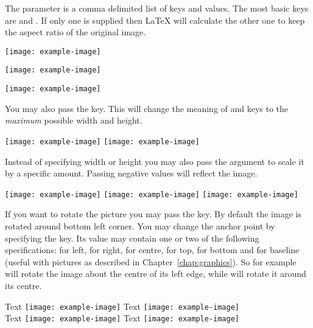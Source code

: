 The  parameter is a comma delimited list of keys and values. The
most basic keys are  and . If only one is supplied
then \LaTeX{} will calculate the other one to keep the aspect ratio of the
original image.
\begin{example}[examplewidth=2.7cm]
\texttt{[image: example-image]}

\texttt{[image: example-image]}

\texttt{[image: example-image]}
\end{example}

You may also pass the  key. This will change the meaning
of  and  keys to the \emph{maximum} possible width
and height.
\begin{example}
\texttt{[image: example-image]}
\texttt{[image: example-image]}
\end{example}

Instead of specifying width or height you may also pass the 
argument to scale it by a specific amount. Passing negative values will
reflect the image.
\begin{example}
\texttt{[image: example-image]}
\texttt{[image: example-image]}
\texttt{[image: example-image]}
\vspace{1.1cm}
\end{example}

If you want to rotate the picture you may pass the  key. By
default the image is rotated around bottom left corner. You may change the
anchor point by specifying the  key. Its value may contain one or
two of the following specifications:  for left,  for right,
 for centre,  for top,  for bottom and  for
baseline (useful with \TikZ{} pictures as described in
Chapter~\ref{chap:graphics}). So for example  will rotate the image
about the centre of its left edge, while  will rotate it around its
centre.
\begin{example}
Text \texttt{[image: example-image]}
Text \texttt{[image: example-image]}  \\
Text \texttt{[image: example-image]}
Text \texttt{[image: example-image]}
\end{example}

